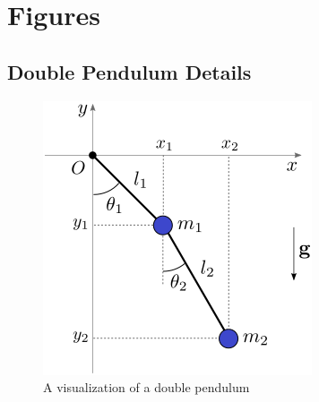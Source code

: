 \section{Figures}\label{sec:figures}

\subsection{Double Pendulum Details}\label{subsec:double-pendulum-details}
\begin{figure}[H]
    \centering
    \includegraphics[scale=1]{figures/double-pendulum.png}
    \caption{A visualization of a double pendulum}
    \label{fig:1}
\end{figure}

